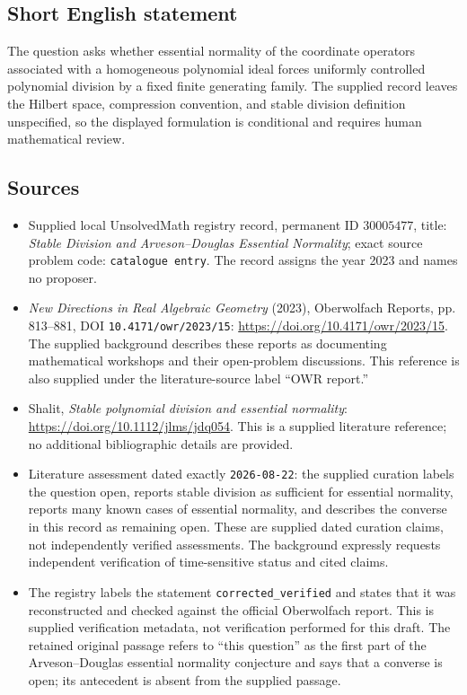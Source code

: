 \documentclass[11pt]{article}
\begin{document}
\subsection{Short English statement}
The question asks whether essential normality of the coordinate operators associated with a homogeneous polynomial ideal forces uniformly controlled polynomial division by a fixed finite generating family. The supplied record leaves the Hilbert space, compression convention, and stable division definition unspecified, so the displayed formulation is conditional and requires human mathematical review.
\subsection{Sources}
\begin{itemize}
\item Supplied local UnsolvedMath registry record, permanent ID \(30005477\), title: \emph{Stable Division and Arveson--Douglas Essential Normality}; exact source problem code: \texttt{catalogue entry}. The record assigns the year 2023 and names no proposer.
\item \emph{New Directions in Real Algebraic Geometry} (2023), Oberwolfach Reports, pp. 813--881, DOI \texttt{10.4171/owr/2023/15}: \url{https://doi.org/10.4171/owr/2023/15}. The supplied background describes these reports as documenting mathematical workshops and their open-problem discussions. This reference is also supplied under the literature-source label ``OWR report.''
\item Shalit, \emph{Stable polynomial division and essential normality}: \url{https://doi.org/10.1112/jlms/jdq054}. This is a supplied literature reference; no additional bibliographic details are provided.
\item Literature assessment dated exactly \texttt{2026-08-22}: the supplied curation labels the question open, reports stable division as sufficient for essential normality, reports many known cases of essential normality, and describes the converse in this record as remaining open. These are supplied dated curation claims, not independently verified assessments. The background expressly requests independent verification of time-sensitive status and cited claims.
\item The registry labels the statement \texttt{corrected\_verified} and states that it was reconstructed and checked against the official Oberwolfach report. This is supplied verification metadata, not verification performed for this draft. The retained original passage refers to ``this question'' as the first part of the Arveson--Douglas essential normality conjecture and says that a converse is open; its antecedent is absent from the supplied passage.
\end{itemize}
\end{document}

